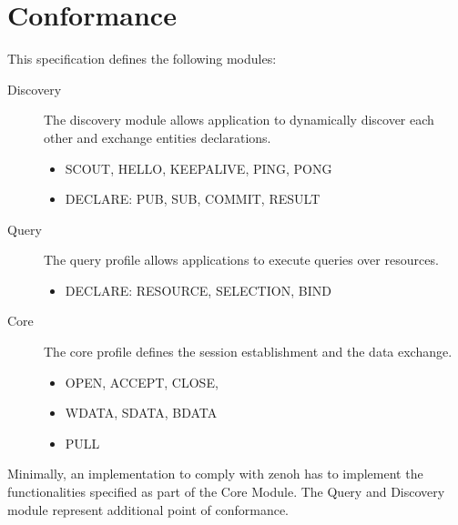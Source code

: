 \documentclass[a4paper,oneside,article]{memoir}
\begin{document}
\chapter{Conformance}
This specification defines the following modules:
\begin{description}
\item[Discovery] The discovery module allows application to dynamically discover each other and exchange entities declarations.
  \begin{itemize}
  \item SCOUT, HELLO, KEEPALIVE, PING, PONG
  \item DECLARE: PUB, SUB, COMMIT, RESULT
  \end{itemize}
\item[Query] The query profile allows applications to execute queries over resources.
  \begin{itemize}
  \item DECLARE: RESOURCE, SELECTION, BIND
  \end{itemize}
\item[Core] The core profile defines the session establishment and the data exchange.
  \begin{itemize}
  \item OPEN, ACCEPT, CLOSE,
  \item WDATA, SDATA, BDATA
  \item PULL
  \end{itemize}
\end{description}

Minimally, an implementation to comply with zenoh has to implement the functionalities specified as part of the Core Module. The Query and Discovery module represent additional point of conformance. 
\end{document}
